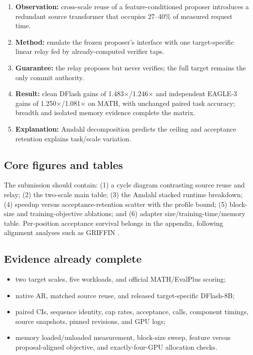 \documentclass[10pt]{article}
\begin{document}
\begin{enumerate}
  \item \textbf{Observation:} cross-scale reuse of a feature-conditioned
        proposer introduces a redundant source transformer that occupies
        27--40\% of measured request time.
  \item \textbf{Method:} emulate the frozen proposer's interface with one
        target-specific linear relay fed by already-computed verifier taps.
  \item \textbf{Guarantee:} the relay proposes but never verifies; the full
        target remains the only commit authority.
  \item \textbf{Result:} clean DFlash gains of
        1.483$\times$/1.246$\times$ and independent EAGLE-3 gains of
        1.250$\times$/1.081$\times$ on MATH, with unchanged paired task
        accuracy; breadth and isolated memory evidence complete the matrix.
  \item \textbf{Explanation:} Amdahl decomposition predicts the ceiling and
        acceptance retention explains task/scale variation.
\end{enumerate}

\subsection{Core figures and tables}

The submission should contain: (1) a cycle diagram contrasting source reuse
and relay; (2) the two-scale main table; (3) the Amdahl stacked runtime
breakdown; (4) speedup versus acceptance-retention scatter with the profile
bound; (5) block-size and training-objective ablations; and (6) adapter
size/training-time/memory table. Per-position acceptance survival belongs in
the appendix, following alignment analyses such as GRIFFIN
\cite{hu2025griffin}.

\subsection{Evidence already complete}

\begin{itemize}
  \item two target scales, five workloads, and official MATH/EvalPlus scoring;
  \item native AR, matched source reuse, and released target-specific DFlash-8B;
  \item paired CIs, sequence identity, cap rates, acceptance, calls,
        component timings, source snapshots, pinned revisions, and GPU logs;
  \item memory loaded/unloaded measurement, block-size sweep, feature versus
        proposal-aligned objective, and exactly-four-GPU allocation checks.
\end{itemize}
\end{document}
